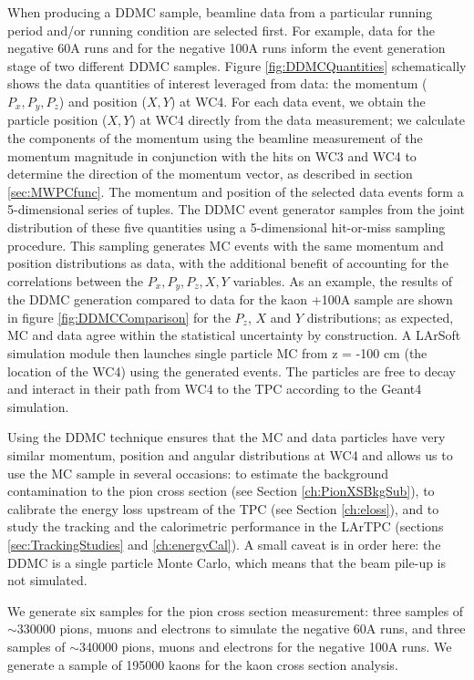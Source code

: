 When producing a DDMC sample, beamline data from a particular running period and/or running condition are selected first. For example, data for the negative 60A runs and for the negative 100A runs inform the event generation stage of two different DDMC samples. Figure \ref{fig:DDMCQuantities}  schematically shows the data quantities of interest leveraged from data: the momentum ($P_x, P_y, P_z$) and position ($X, Y$) at WC4. For each data event, we obtain the  particle position ($X, Y$) at WC4 directly from the data measurement; we calculate the components of the momentum using the beamline measurement of the momentum magnitude in conjunction with the hits on WC3 and WC4 to determine the direction of the momentum vector, as described in section \ref{sec:MWPCfunc}. The momentum and position of the selected data events form a 5-dimensional series of tuples.  The DDMC event generator samples from the joint distribution of these five quantities using a 5-dimensional hit-or-miss sampling procedure. This sampling generates MC events  with the same momentum and position distributions as data, with the additional benefit of accounting for the correlations between the $P_x, P_y, P_z, X, Y$ variables.  As an example, the results of the DDMC generation compared to data for the kaon +100A sample are shown in figure \ref{fig:DDMCComparison} for the $P_z$, $X$ and $Y$ distributions; as expected, MC and data agree within the statistical uncertainty by construction. A LArSoft simulation module then launches single particle MC from z = -100 cm (the location of the WC4) using the generated events. The particles are free to decay and interact in their path from WC4 to the TPC according to the Geant4 simulation.

Using the DDMC technique ensures that the MC and data particles have very similar momentum, position and angular distributions at WC4 and allows us to use the MC sample in several occasions: to estimate the background contamination to the pion cross section (see Section \ref{ch:PionXSBkgSub}), to calibrate the energy loss upstream of the TPC (see Section \ref{ch:eloss}),  and to study the tracking and the calorimetric performance  in the LArTPC (sections \ref{sec:TrackingStudies} and \ref{ch:energyCal}). A small caveat is in order here: the DDMC is a single particle Monte Carlo, which means that the beam pile-up is not simulated. 


We generate six samples for the pion cross section measurement: three samples of  $\sim$330000 pions, muons and electrons to simulate the negative 60A runs, and three samples of $\sim$340000 pions, muons and electrons for the negative 100A runs. We generate a sample of  195000  kaons for the kaon cross section analysis.

